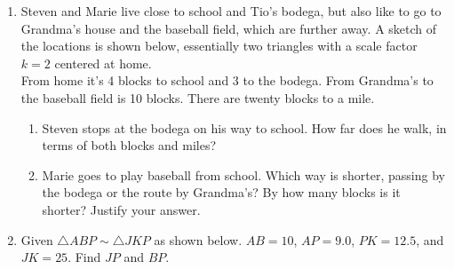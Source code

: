 \documentclass[12pt, twoside]{article}
\begin{document}
\begin{enumerate}
\newpage
\item Steven and Marie live close to school and Tio's bodega, but also like to go to Grandma's house and the baseball field, which are further away. A sketch of the locations is shown below, essentially two triangles with a scale factor $k=2$ centered at home.\\[0.25cm]
From home it's 4 blocks to school and 3 to the bodega. From Grandma's to the baseball field is 10 blocks. There are twenty blocks to a mile.
\begin{enumerate}
    \item Steven stops at the bodega on his way to school. How far does he walk, in terms of both blocks and miles?
        \begin{flushright}
        \end{flushright} 
    \item Marie goes to play baseball from school. Which way is shorter, passing by the bodega or the route by Grandma's? By how many blocks is it shorter? Justify your answer.
\end{enumerate} \vspace{4cm}

\item Given $\triangle ABP \sim \triangle JKP$ as shown below. $AB=10$, $AP=9.0$, $PK=12.5$, and $JK=25$. Find $JP$ and $BP$.
  \begin{flushright}
    \end{flushright}


\end{enumerate}
\end{document}
